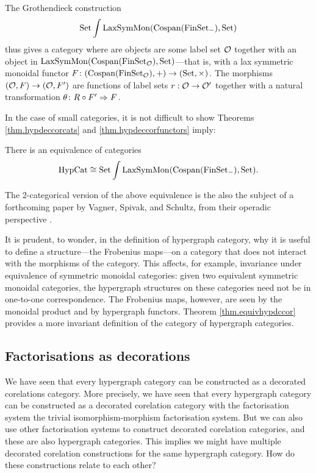 The Grothendieck construction 
\[
 \mathrm{Set}\int \mathrm{LaxSymMon}(\operatorname{{Cospan}}(\mathrm{FinSet}_{-}), \mathrm{Set})
\]
thus gives a category where are objects are some label set $\mathcal O$ together with
an object in $\mathrm{LaxSymMon}(\operatorname{{Cospan}}(\mathrm{FinSet}_{\mathcal O}), \mathrm{Set})$---that is,
with a lax symmetric monoidal functor $F{\colon} (\operatorname{{Cospan}}(\mathrm{FinSet}_{\mathcal O}),+) \to
(\mathrm{Set},\times)$. The morphisms $(\mathcal O, F) \to (\mathcal O,F')$ are functions of label
sets $r: \mathcal O \to \mathcal O'$ together with a natural transformation $\theta{\colon}
R \circ F'\Rightarrow F$.

In the case of small categories, it is not difficult to show Theorems
\ref{thm.hypdeccorcats} and \ref{thm.hypdeccorfunctors} imply:

\begin{theorem} \label{thm.equivhypdccor}
  There is an equivalence of categories
\[
  \mathrm{HypCat} \cong \mathrm{Set}\int \mathrm{LaxSymMon}(\operatorname{{Cospan}}(\mathrm{FinSet}_{-}), \mathrm{Set}).
\]
\end{theorem}

The 2-categorical version of the above equivalence is the also the subject of a
forthcoming paper by Vagner, Spivak, and Schultz, from their operadic
perspective \cite{VSS}.

\begin{remark}
  It is prudent, to wonder, in the definition of hypergraph category, why it is
  useful to define a structure---the Frobenius maps---on a category that does
  not interact with the morphisms of the category. This affects, for example,
  invariance under equivalence of symmetric monoidal categories: given two
  equivalent symmetric monoidal categories, the hypergraph structures on these
  categories need not be in one-to-one correspondence. The Frobenius maps,
  however, are seen by the monoidal product and by hypergraph functors. Theorem
  \ref{thm.equivhypdccor} provides a more invariant definition of the category
  of hypergraph categories.
\end{remark}

\subsection{Factorisations as decorations}

We have seen that every hypergraph category can be constructed as a decorated
corelations category. More precisely, we have seen that every hypergraph
category can be constructed as a decorated corelation category with the
factorisation system the trivial isomorphism-morphism factorisation system. But
we can also use other factorisation systems to construct decorated corelation
categories, and these are also hypergraph categories. This implies we might have
multiple decorated corelation constructions for the same hypergraph category.
How do these constructions relate to each other?

